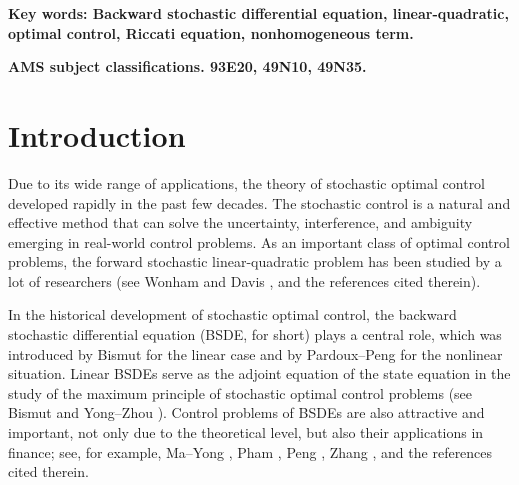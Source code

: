 \documentclass[11pt,times,twoside]{article}
\def\ms{\medskip}         \def\da{\mathop{\downarrow}}       \def\rt{\right}
\def\no{\noindent}        \def\q{\quad}                      \def\llan{\left\langle}
\begin{document}
\ms

\no\bf Key words: \rm Backward stochastic differential equation, linear-quadratic, optimal control, Riccati equation, nonhomogeneous term.

\ms

\no\bf AMS subject classifications. \rm
93E20, 49N10, 49N35.


\section{Introduction}

Due to its wide range of applications, the theory of stochastic optimal control developed
rapidly in the past few decades.
The stochastic control is a natural and effective method that can solve the uncertainty,
interference, and ambiguity emerging in real-world control problems.
As an important class of optimal control problems, the forward stochastic linear-quadratic problem
has been studied by a lot of researchers (see Wonham \cite{Wonham1968} and Davis \cite{Davis1977},
and the references cited therein).

\ms

In the historical development of stochastic optimal control, the backward stochastic differential equation
(BSDE, for short) plays a central role, which was introduced by Bismut \cite{Bismut1973} for the linear case
and by Pardoux--Peng \cite{Pardoux-Peng1990} for the nonlinear situation.
Linear BSDEs serve as the adjoint equation of the state equation in the study of the maximum principle
of stochastic optimal control problems (see Bismut \cite{Bismut1973} and Yong--Zhou \cite{Yong-Zhou1999}).
Control problems of BSDEs are also attractive and important, not only due to the theoretical level,
but also their applications in finance; see, for example, Ma--Yong \cite{Ma-Yong1999}, Pham \cite {Pham2009},
Peng \cite{Peng2010}, Zhang \cite{Zhang2017}, and the references cited therein.


\ms
\end{document}
